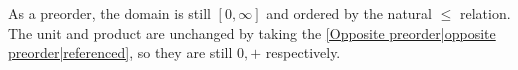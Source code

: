 As a preorder, the domain is still $[0,\infty]$ and ordered by the natural $\leq$ relation.  The unit and product are unchanged by taking the \ref{Opposite preorder|opposite preorder|referenced}, so they are still $0, +$ respectively.
